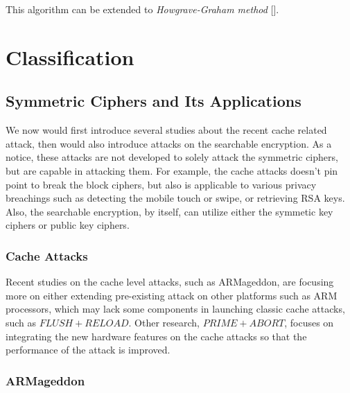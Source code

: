 \documentclass[a4paper]{article}
\begin{document}
This algorithm can be extended to \textit{Howgrave-Graham method} [].

\section{Classification}

\subsection{Symmetric Ciphers and Its Applications}

We now would first introduce several studies about the recent cache related attack, then would also introduce attacks on the searchable encryption. As a notice, these attacks are not developed to solely attack the symmetric ciphers, but are capable in attacking them. For example, the cache attacks doesn't pin point to break the block ciphers, but also is applicable to various privacy breachings such as detecting the mobile touch or swipe, or retrieving RSA keys. Also, the searchable encryption, by itself, can utilize either the symmetic key ciphers or public key ciphers.

\subsubsection{Cache Attacks}

Recent studies on the cache level attacks, such as ARMageddon, are focusing more on either extending pre-existing attack on other platforms such as ARM processors, which may lack some components in launching classic cache attacks, such as $FLUSH+RELOAD$. Other research, $PRIME+ABORT$, focuses on integrating the new hardware features on the cache attacks so that the performance of the attack is improved.

\subsubsection*{ARMageddon}
\end{document}
